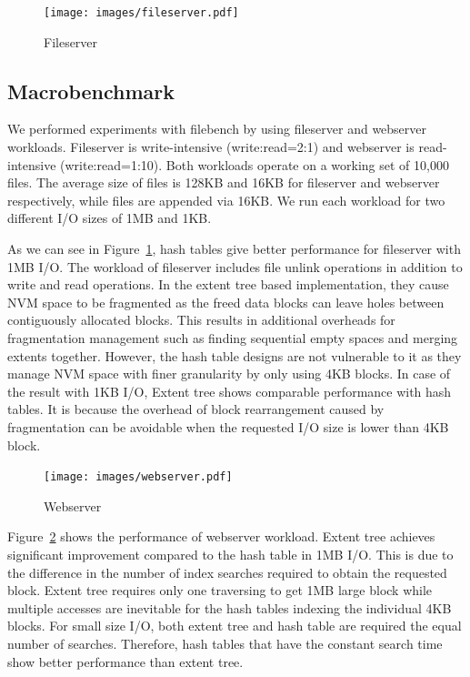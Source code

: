 \documentclass[letterpaper,twocolumn, 11pt]{article}
\begin{document}
\begin{figure}[t]
\centering
\texttt{[image: images/fileserver.pdf]}
\caption{Fileserver}
\label{fig:fileserver}
\end{figure}
\vspace{-0.3cm}
\subsection{Macrobenchmark}
We performed experiments with filebench by using fileserver and webserver workloads. Fileserver is write-intensive (write:read=2:1) and webserver is read-intensive (write:read=1:10). Both workloads operate on a working set of 10,000 files. The average size of files is 128KB and 16KB for fileserver and webserver respectively, while files are appended via 16KB. We run each workload for two different I/O sizes of 1MB and 1KB.

As we can see in Figure~\ref{fig:fileserver}, hash tables give better performance for fileserver with 1MB I/O. The workload of fileserver includes file unlink operations in addition to write and read operations. In the extent tree based implementation, they cause NVM space to be fragmented as the freed data blocks can leave holes between contiguously allocated blocks. This results in additional overheads for fragmentation management such as finding sequential empty spaces and merging extents together. However, the hash table designs are not vulnerable to it as they manage NVM space with finer granularity by only using 4KB blocks. In case of the result with 1KB I/O, Extent tree shows comparable performance with hash tables. It is because the overhead of block rearrangement caused by fragmentation can be avoidable when the requested I/O size is lower than 4KB block.

\begin{figure}[t]
\centering
\texttt{[image: images/webserver.pdf]}
\caption{Webserver}
\label{fig:webserver}
\end{figure}

Figure~\ref{fig:webserver} shows the performance of webserver workload. Extent tree achieves significant improvement compared to the hash table in 1MB I/O. This is due to the difference in the number of index searches required to obtain the requested block. Extent tree requires only one traversing to get 1MB large block while multiple accesses are inevitable for the hash tables indexing the individual 4KB blocks. For small size I/O, both extent tree and hash table are required the equal number of searches. Therefore, hash tables that have the constant search time show better performance than extent tree.
\end{document}

